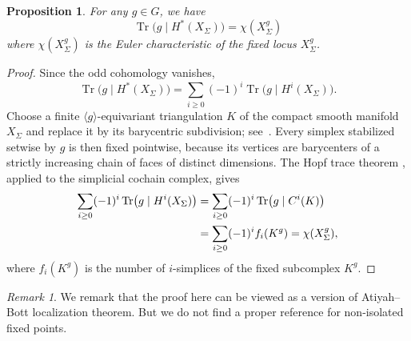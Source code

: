 \documentclass[12pt]{amsart}
\newtheorem{prop}[theorem]{Proposition}
\theoremstyle{remark}
\newtheorem{remark}[theorem]{Remark}
\begin{document}
\begin{prop}\label{prop:char=Eulercharoffixedloci}
For any $g\in G$, we have 
$$
\operatorname{Tr}\big(g\mid H^{*}(X_\Sigma)\big)
=\chi(X_\Sigma^g)$$
where $\chi(X_\Sigma^g)$  is the Euler characteristic of the fixed locus $X_\Sigma^g$. 
\end{prop}
\begin{proof}
Since the odd cohomology vanishes,
$$
\operatorname{Tr}\big(g\mid H^*(X_\Sigma)\big)
  =\sum_{i\geq 0}(-1)^i
   \operatorname{Tr}\big(g\mid H^i(X_\Sigma)\big).
$$
Choose a finite $\langle g\rangle$-equivariant triangulation $K$ of the
compact smooth manifold $X_\Sigma$ and replace it by its barycentric
subdivision; see~\cite{Illman}.  Every simplex stabilized setwise by $g$
is then fixed pointwise, because its vertices are barycenters of a strictly
increasing chain of faces of distinct dimensions.  The Hopf trace theorem
\cite[p.~122]{Munkres}, applied to the simplicial cochain complex, gives
\begin{align*}
\sum_{i\geq 0}(-1)^i
 \operatorname{Tr}\bigl(g\mid H^i(X_\Sigma)\bigr)
&=\sum_{i\geq 0}(-1)^i
 \operatorname{Tr}\bigl(g\mid C^i(K)\bigr)\notag\\
&=\sum_{i\geq 0}(-1)^i f_i(K^{g})
 =\chi(X_\Sigma^g),
\end{align*}
where $f_i(K^{g})$ is the number of $i$-simplices of the fixed subcomplex $K^{g}$.
\end{proof}

\begin{remark}
We remark that the proof here can be viewed as a version of Atiyah--Bott localization theorem. But we do not find a proper reference for non-isolated fixed points. 
\end{remark}
\end{document}
